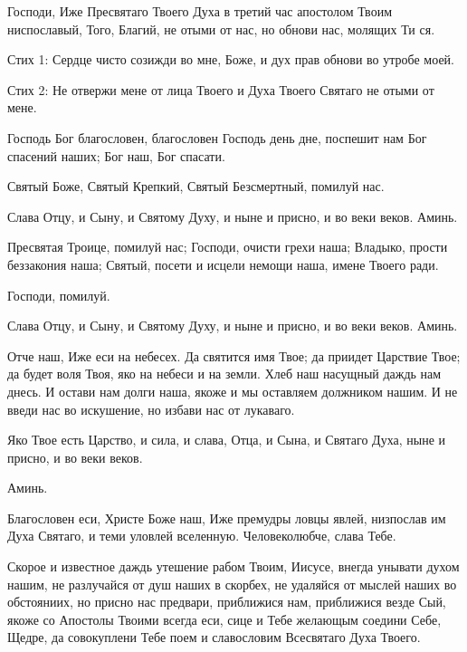 \begin{mymulticols}
Господи, Иже Пресвятаго Твоего Духа в третий час апостолом Твоим ниспославый, Того, Благий, не отыми от нас, но обнови нас, молящих Ти ся.

Стих 1: Сердце чисто созижди во мне, Боже, и дух прав обнови во утробе моей. 

Стих 2: Не отвержи мене от лица Твоего и Духа Твоего Святаго не отыми от мене. 

\slavainynen

\myemph{]}

Господь Бог благословен, благословен Господь день дне, поспешит нам Бог спасений наших; Бог наш, Бог спасати.

Святый Боже, Святый Крепкий, Святый Безсмертный, помилуй нас. 

Слава Отцу, и Сыну, и Святому Духу, и ныне и присно, и во веки веков. Аминь.

Пресвятая Троице, помилуй нас; Господи, очисти грехи наша; Владыко, прости беззакония наша; Святый, посети и исцели немощи наша, имене Твоего ради.

Господи, помилуй. 

Слава Отцу, и Сыну, и Святому Духу, и ныне и присно, и во веки веков. Аминь.

Отче наш, Иже еси на небесех. Да святится имя Твое; да приидет Царствие Твое; да будет воля Твоя, яко на небеси и на земли. Хлеб наш насущный даждь нам днесь. И остави нам долги наша, якоже и мы оставляем должником нашим. И не введи нас во искушение, но избави нас от лукаваго.

 Яко Твое есть Царство, и сила, и слава, Отца, и Сына, и Святаго Духа, ныне и присно, и во веки веков.

 Аминь.




\myemph{[Если пост, или нет кондака, читаем эти тропари, глас 8-й:}

Благословен еси, Христе Боже наш, Иже премудры ловцы явлей, низпослав им Духа Святаго, и теми уловлей вселенную. Человеколюбче, слава Тебе.

\slavan

Скорое и известное даждь утешение рабом Твоим, Иисусе, внегда унывати духом нашим, не разлучайся от душ наших в скорбех, не удаляйся от мыслей наших во обстояниих, но присно нас предвари, приближися нам, приближися везде Сый, якоже со Апостолы Твоими всегда еси, сице и Тебе желающым соедини Себе, Щедре, да совокуплени Тебе поем и славословим Всесвятаго Духа Твоего.


\end{mymulticols}

